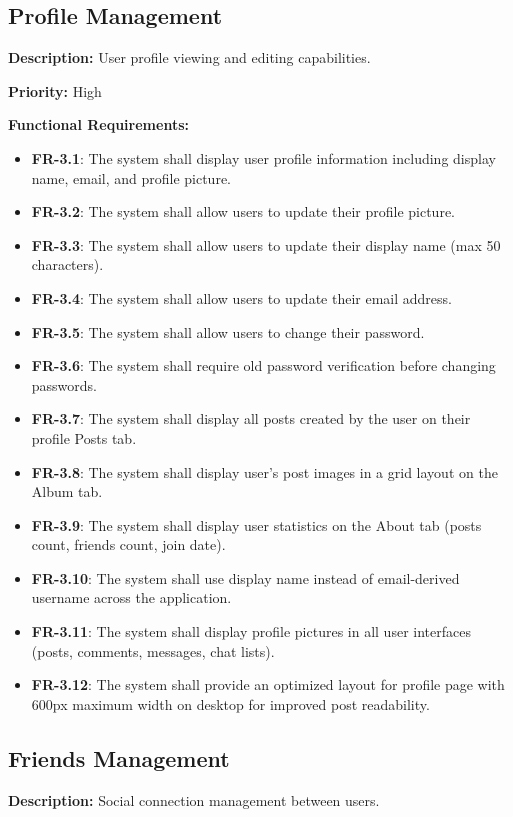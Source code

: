 \documentclass[12pt,a4paper]{article}
\begin{document}
\subsection{Profile Management}
\textbf{Description:} User profile viewing and editing capabilities.

\textbf{Priority:} High

\textbf{Functional Requirements:}

\begin{itemize}
    \item \textbf{FR-3.1}: The system shall display user profile information including display name, email, and profile picture.
    \item \textbf{FR-3.2}: The system shall allow users to update their profile picture.
    \item \textbf{FR-3.3}: The system shall allow users to update their display name (max 50 characters).
    \item \textbf{FR-3.4}: The system shall allow users to update their email address.
    \item \textbf{FR-3.5}: The system shall allow users to change their password.
    \item \textbf{FR-3.6}: The system shall require old password verification before changing passwords.
    \item \textbf{FR-3.7}: The system shall display all posts created by the user on their profile Posts tab.
    \item \textbf{FR-3.8}: The system shall display user's post images in a grid layout on the Album tab.
    \item \textbf{FR-3.9}: The system shall display user statistics on the About tab (posts count, friends count, join date).
    \item \textbf{FR-3.10}: The system shall use display name instead of email-derived username across the application.
    \item \textbf{FR-3.11}: The system shall display profile pictures in all user interfaces (posts, comments, messages, chat lists).
    \item \textbf{FR-3.12}: The system shall provide an optimized layout for profile page with 600px maximum width on desktop for improved post readability.
\end{itemize}

\subsection{Friends Management}
\textbf{Description:} Social connection management between users.
\end{document}
